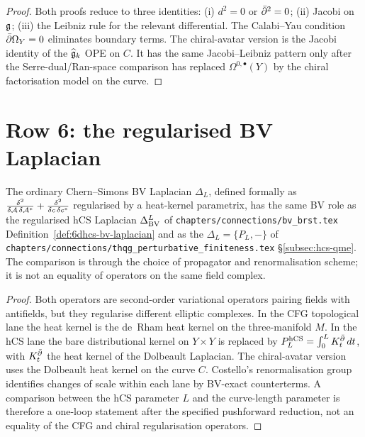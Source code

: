 \begin{proof}
Both proofs reduce to three identities: (i) $d^2=0$ or $\bar\partial^2 = 0$;
(ii) Jacobi on $\mathfrak{g}$; (iii) the Leibniz rule for the relevant
differential.
The Calabi--Yau condition $\bar\partial\Omega_Y = 0$ eliminates boundary
terms. The chiral-avatar version is the Jacobi identity of the
$\widehat{\mathfrak{g}}_k$ OPE on $C$. It has the same Jacobi--Leibniz pattern
only after the Serre-dual/Ran-space comparison has replaced
$\Omega^{0,\bullet}(Y)$ by the chiral factorisation model on the
curve.
\end{proof}

\section{Row 6: the regularised BV Laplacian}
\label{sec:cfg-row-6-bv-laplacian}

\begin{theorem}
\label{thm:cfg-row-6}
The ordinary Chern--Simons BV Laplacian $\Delta_L$, defined formally as
$\frac{\delta^2}{\delta\mathcal{A}\,\delta\mathcal{A}^*}
+ \frac{\delta^2}{\delta c\,\delta c^*}$
regularised by a heat-kernel parametrix, has the same BV role as the
regularised hCS Laplacian $\Delta_{\mathrm{BV}}^L$ of
\texttt{chapters/connections/bv\_brst.tex}
Definition~\ref{def:6dhcs-bv-laplacian} and as the
$\Delta_L = \{P_L,-\}$ of
\texttt{chapters/connections/thqg\_perturbative\_finiteness.tex}
\S\ref{subsec:hcs-qme}. The comparison is through the choice of
propagator and renormalisation scheme; it is not an equality of
operators on the same field complex.
\end{theorem}

\begin{proof}
Both operators are second-order variational operators pairing fields
with antifields, but they regularise different elliptic complexes. In
the CFG topological lane the heat kernel is the de~Rham heat kernel on
the three-manifold $M$. In the hCS lane the bare distributional kernel
on $Y\times Y$ is replaced by
$P_L^{\mathrm{hCS}}=\int_0^L K_t^{\bar\partial}\,dt$, with $K_t^{\bar\partial}$ the heat
kernel of the Dolbeault Laplacian. The chiral-avatar version uses the
Dolbeault heat kernel on the curve $C$. Costello's renormalisation group
identifies changes of scale within each lane by BV-exact counterterms.
A comparison between the hCS parameter $L$ and the curve-length
parameter is therefore a one-loop statement after the specified
pushforward reduction, not an equality of the CFG and chiral
regularisation operators.
\end{proof}

